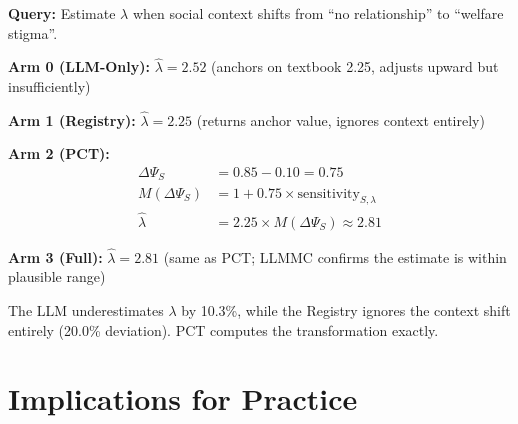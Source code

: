 \begin{tcolorbox}[colback=falightgray, colframe=fadarkblue, title=Example: S2 Query for $\lambda$]
\textbf{Query:} Estimate $\lambda$ when social context shifts from
``no relationship'' to ``welfare stigma''.

\textbf{Arm 0 (LLM-Only):} $\hat{\lambda} = 2.52$ (anchors on textbook 2.25,
adjusts upward but insufficiently)

\textbf{Arm 1 (Registry):} $\hat{\lambda} = 2.25$ (returns anchor value,
ignores context entirely)

\textbf{Arm 2 (PCT):}
\begin{align*}
\Delta\Psi_S &= 0.85 - 0.10 = 0.75 \\
M(\Delta\Psi_S) &= 1 + 0.75 \times \text{sensitivity}_{S,\lambda} \\
\hat{\lambda} &= 2.25 \times M(\Delta\Psi_S) \approx 2.81
\end{align*}

\textbf{Arm 3 (Full):} $\hat{\lambda} = 2.81$ (same as PCT; LLMMC
confirms the estimate is within plausible range)
\end{tcolorbox}

The LLM underestimates $\lambda$ by 10.3\%, while the Registry ignores
the context shift entirely (20.0\% deviation). PCT computes the
transformation exactly.



\section{Implications for Practice}
\label{sec:lb-implications}

